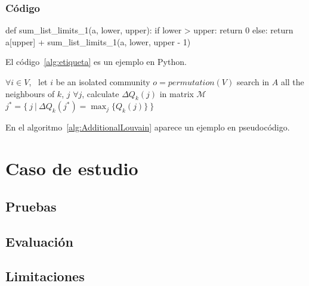 \documentclass[12pt,twoside,titlepage]{report}
\begin{document}
\newpage



\subsection{Código}


\begin{mypython}[float={!t},caption={Titulo del algoritmo/código.},label={alg:etiqueta}]
def sum_list_limits_1(a, lower, upper):
    if lower > upper:
        return 0
    else:
        return a[upper] + sum_list_limits_1(a, lower, upper - 1)
\end{mypython}
El código~\ref{alg:etiqueta} es un ejemplo en Python.



\begin{algorithm}
\begin{algorithmic}[1]
\STATE $\forall i \in V$, \ let $i$ be an isolated community
\STATE $o=permutation(V)$
\STATE search in $A$ all the neighbours of $k$, $j$
\STATE $\forall j$, calculate $\Delta Q_k(j)$ in matrix $\mathcal{M}$
\STATE $j^*=\{ \ j \ | \ \Delta Q_k(j^*)=\max_j\{Q_k(j)\} \ \}$
\ELSE
{}
\ENDIF
\ENDFOR
\end{algorithmic}\caption{\textit{Additional Louvain} \textbf{input}=$\left(A, \ \mathcal{M}\right)$ \textbf{output}=$P$}
\label{alg:AdditionalLouvain}
\end{algorithm}
En el algoritmo~\ref{alg:AdditionalLouvain} aparece un ejemplo en pseudocódigo.



\chapter{Caso de estudio}

\section{Pruebas}


\section{Evaluación}


\section{Limitaciones}
\end{document}
